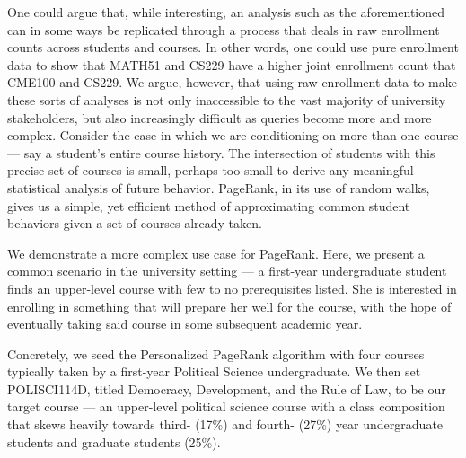 One could argue that, while interesting, an analysis such as the aforementioned can in some ways be replicated through a process that deals in raw enrollment counts across students and courses. In other words, one could use pure enrollment data to show that MATH51 and CS229 have a higher joint enrollment count that CME100 and CS229. We argue, however, that using raw enrollment data to make these sorts of analyses is not only inaccessible to the vast majority of university stakeholders, but also increasingly difficult as queries become more and more complex. Consider the case in which we are conditioning on more than one course --- say a student's entire course history. The intersection of students with this precise set of courses is small, perhaps too small to derive any meaningful statistical analysis of future behavior. PageRank, in its use of random walks, gives us a simple, yet efficient method of approximating common student behaviors given a set of courses already taken.

We demonstrate a more complex use case for PageRank. Here, we present a common scenario in the university setting --- a first-year undergraduate student finds an upper-level course with few to no prerequisites listed. She is interested in enrolling in something that will prepare her well for the course, with the hope of eventually taking said course in some subsequent academic year. 

Concretely, we seed the Personalized PageRank algorithm with four courses typically taken by a first-year Political Science undergraduate. We then set POLISCI114D, titled Democracy, Development, and the Rule of Law, to be our target course --- an upper-level political science course with a class composition that skews heavily towards third- (17\%) and fourth- (27\%) year undergraduate students and graduate students (25\%).


